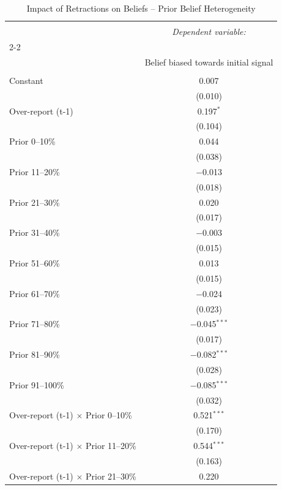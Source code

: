 
\begin{table}[!htbp] \centering 
  \caption{Impact of Retractions on Beliefs -- Prior Belief Heterogeneity} 
  \label{} 
\begin{tabular}{@{\extracolsep{5pt}}lc} 
\\[-1.8ex]\hline 
\hline \\[-1.8ex] 
 & \multicolumn{1}{c}{\textit{Dependent variable:}} \\ 
\cline{2-2} 
\\[-1.8ex] & Belief biased towards initial signal \\ 
\hline \\[-1.8ex] 
 Constant & 0.007 \\ 
  & (0.010) \\ 
  Over-report (t-1) & 0.197$^{*}$ \\ 
  & (0.104) \\ 
  Prior 0--10\% & 0.044 \\ 
  & (0.038) \\ 
  Prior 11--20\% & $-$0.013 \\ 
  & (0.018) \\ 
  Prior 21--30\% & 0.020 \\ 
  & (0.017) \\ 
  Prior 31--40\% & $-$0.003 \\ 
  & (0.015) \\ 
  Prior 51--60\% & 0.013 \\ 
  & (0.015) \\ 
  Prior 61--70\% & $-$0.024 \\ 
  & (0.023) \\ 
  Prior 71--80\% & $-$0.045$^{***}$ \\ 
  & (0.017) \\ 
  Prior 81--90\% & $-$0.082$^{***}$ \\ 
  & (0.028) \\ 
  Prior 91--100\% & $-$0.085$^{***}$ \\ 
  & (0.032) \\ 
  Over-report (t-1) $\times$ Prior 0--10\% & 0.521$^{***}$ \\ 
  & (0.170) \\ 
  Over-report (t-1) $\times$ Prior 11--20\% & 0.544$^{***}$ \\ 
  & (0.163) \\ 
  Over-report (t-1) $\times$ Prior 21--30\% & 0.220 \\ 

\end{tabular}
\end{table}
